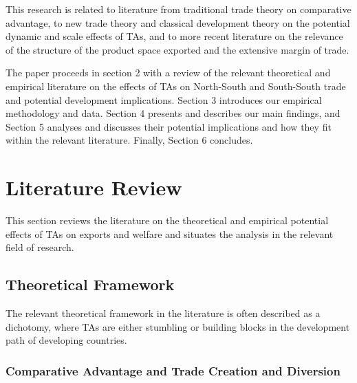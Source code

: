 \documentclass[12pt]{article}%
\begin{document}
This research is related to literature from traditional trade theory on
comparative advantage, to new trade theory and classical development
theory on the potential dynamic and scale effects of TAs, and to more
recent literature on the relevance of the structure of the product space
exported and the extensive margin of trade.

The paper proceeds in section 2 with a review of the relevant
theoretical and empirical literature on the effects of TAs on
North-South and South-South trade and potential development
implications. Section 3 introduces our empirical methodology and data.
Section 4 presents and describes our main findings, and Section 5
analyses and discusses their potential implications and how they fit
within the relevant literature. Finally, Section 6 concludes.

%
\section{Literature Review}%
\label{sec:LiteratureReview}%
This section reviews the literature on the theoretical and empirical potential effects of TAs on exports and welfare and situates the analysis in the relevant field of research.%
\subsection{Theoretical Framework}%
\label{subsec:TheoreticalFramework}%
The relevant theoretical framework in the literature is often described as a dichotomy, where TAs are either stumbling or building blocks in the development path of developing countries.%
\subsubsection{Comparative Advantage and Trade Creation and Diversion}%
\label{ssubsec:ComparativeAdvantageandTradeCreationandDiversion}%
\end{document}
